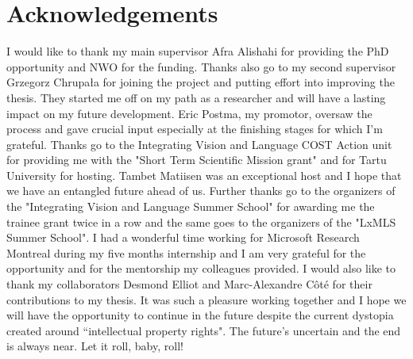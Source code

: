 {}

\chapter*{Acknowledgements}

I would like to thank my main supervisor Afra Alishahi for providing the PhD opportunity 
and NWO for the funding. Thanks also go to my second supervisor Grzegorz Chrupała for joining the project
and putting effort into improving the thesis. 
They started me off on my path as a researcher and will have a lasting 
impact on my future development.
Eric Postma, my promotor, oversaw the process and gave crucial input especially at the finishing stages
for which I'm grateful. Thanks go to the Integrating Vision and Language COST Action unit for providing me with the
"Short Term Scientific Mission grant" and for Tartu University for hosting. 
Tambet Matiisen was an exceptional host and I hope that we have an entangled future ahead of us.
Further thanks go to the organizers of the "Integrating Vision and Language Summer School" for 
awarding me the trainee grant twice in a row and the same goes to the organizers of the "LxMLS Summer School". 
I had a wonderful time working for Microsoft Research Montreal during my five months internship
and I am very grateful for the opportunity and for the mentorship my colleagues provided.
I would also like to thank my collaborators Desmond Elliot and Marc-Alexandre Côté for their contributions
to my thesis. It was such a pleasure working together and I hope we will have the opportunity to continue in the
future despite the current dystopia created around ``intellectual property rights".
The future's uncertain and the end is always near. Let it roll, baby, roll!








